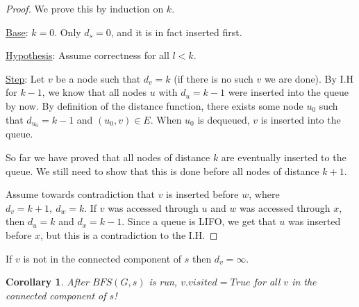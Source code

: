 \documentclass[12pt]{article}
\newtheorem{corollary}[thm]{Corollary} \newtheorem{claim}[thm]{Claim}
\begin{document}
\begin{proof}
We prove this by induction on $k$. 

\underline{Base}: $k=0$. Only $d_s=0$, and it is in fact inserted first.

\underline{Hypothesis}: Assume correctness for all $l<k$.

\underline{Step}: Let $v$ be a node such that $d_v=k$ (if there is no such $v$ we are done). By I.H for $k-1$, we know that all nodes $u$ with $d_u=k-1$ were inserted into the queue by now. By definition of the distance function, there exists some node $u_0$ such that $d_{u_0}=k-1$ and $(u_0,v)\in E$. When $u_0$ is dequeued, $v$ is inserted into the queue. 

So far we have proved that all nodes of distance $k$ are eventually inserted to the queue. We still need to show that this is done before all nodes of distance $k+1$. 

Assume towards contradiction that $v$ is inserted before $w$, where $d_v=k+1,\ d_w=k$. If $v$ was accessed through $u$ and $w$ was accessed through $x$, then $d_u = k$ and $d_x=k-1$. Since a queue is LIFO, we get that $u$ was inserted before $x$, but this is a contradiction to the I.H.


\end{proof}

\begin{remark}
If $v$ is not in the connected component of $s$ then $d_v=\infty$.
\end{remark}


\begin{corollary}
After $BFS(G,s)$ is run, $v.visited = True$ for all $v$ in the connected component of $s$!
\end{corollary}
\end{document}
